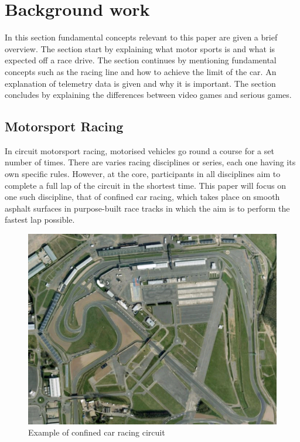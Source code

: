 \documentclass{sig-alternate}
\begin{document}
\section{Background work} {
\label{sec:background}

In this section fundamental concepts relevant to this paper are given a brief overview. The section start by explaining what motor sports is and what is expected off a race drive. The section continues by mentioning fundamental concepts such as the racing line and how to achieve the limit of the car. An explanation of telemetry data is given and why it is important. The section concludes by explaining the differences between video games and serious games. 

\subsection{Motorsport Racing}
In circuit motorsport racing, motorised vehicles go round a course for a set number of times. There are varies racing disciplines or series, each one having its own specific rules. However, at the core, participants in all disciplines aim to complete a full lap of the circuit in the shortest time. This paper will focus on one such discipline, that of confined car racing, which takes place on smooth asphalt surfaces in purpose-built race tracks in which the aim is to perform the fastest lap possible. 

\begin{figure}[!htb]
	\centering
	\begin{minipage}{0.45\textwidth}
		\centering
		\includegraphics[width=\textwidth]{images/confinedCircuit}
		\caption{Example of confined car racing circuit}
		\label{fig:circuit-overhead}
	\end{minipage}\hfill
\end{figure}

}
\end{document}
